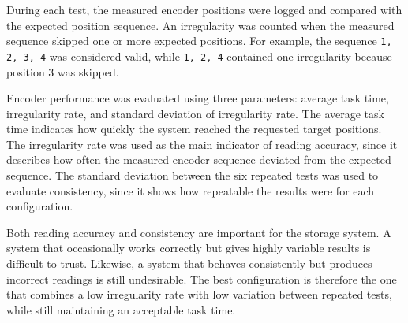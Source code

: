 During each test, the measured encoder positions were logged and compared with the expected position sequence. An irregularity was counted when the measured sequence skipped one or more expected positions. For example, the sequence \texttt{1, 2, 3, 4} was considered valid, while \texttt{1, 2, 4} contained one irregularity because position 3 was skipped.

Encoder performance was evaluated using three parameters: average task time, irregularity rate, and standard deviation of irregularity rate. The average task time indicates how quickly the system reached the requested target positions. The irregularity rate was used as the main indicator of reading accuracy, since it describes how often the measured encoder sequence deviated from the expected sequence. The standard deviation between the six repeated tests was used to evaluate consistency, since it shows how repeatable the results were for each configuration.

Both reading accuracy and consistency are important for the storage system. A system that occasionally works correctly but gives highly variable results is difficult to trust. Likewise, a system that behaves consistently but produces incorrect readings is still undesirable. The best configuration is therefore the one that combines a low irregularity rate with low variation between repeated tests, while still maintaining an acceptable task time.





